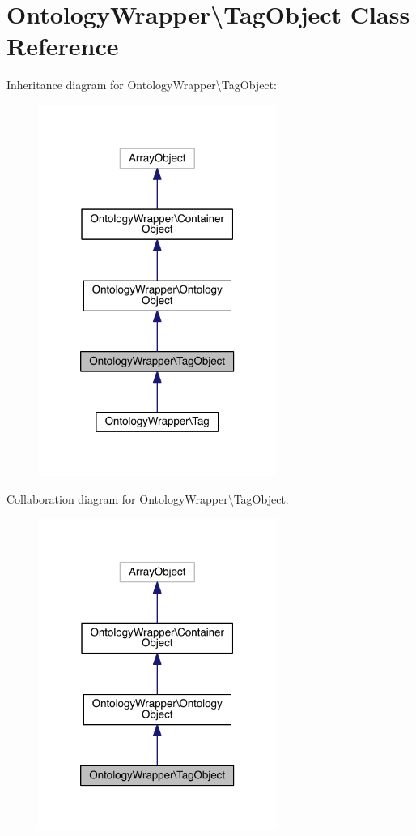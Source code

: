 \hypertarget{class_ontology_wrapper_1_1_tag_object}{\section{Ontology\-Wrapper\textbackslash{}Tag\-Object Class Reference}
\label{class_ontology_wrapper_1_1_tag_object}
}


Inheritance diagram for Ontology\-Wrapper\textbackslash{}Tag\-Object\-:
\nopagebreak
\begin{figure}[H]
\begin{center}
\leavevmode
\includegraphics[width=220pt]{class_ontology_wrapper_1_1_tag_object__inherit__graph}
\end{center}
\end{figure}


Collaboration diagram for Ontology\-Wrapper\textbackslash{}Tag\-Object\-:
\nopagebreak
\begin{figure}[H]
\begin{center}
\leavevmode
\includegraphics[width=220pt]{class_ontology_wrapper_1_1_tag_object__coll__graph}
\end{center}
\end{figure}
